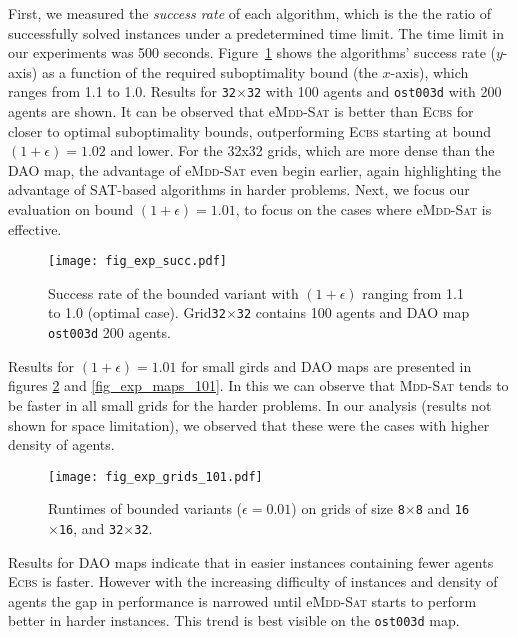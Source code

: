 \documentclass[letterpaper]{article}
\begin{document}
First, we measured the {\em success rate} of each algorithm, which is the the ratio of successfully solved instances under a predetermined time limit. The time limit in our experiments was 500 seconds. 
Figure~\ref{fig_exp_succ} shows the algorithms' success rate ($y$-axis) as a function of the required suboptimality bound (the $x$-axis), which ranges from 1.1 to 1.0. Results for \texttt{32$\times$32} with 100 agents and  \texttt{ost003d} with 200 agents are shown. It can be observed that  e\textsc{Mdd-Sat} is better than \textsc{Ecbs} for closer to optimal suboptimality bounds, 
outperforming  \textsc{Ecbs} starting at bound $(1+\epsilon)=1.02$ and lower. 
For the 32x32 grids, which are more dense than the DAO map, the advantage of e\textsc{Mdd-Sat}
even begin earlier, again highlighting the advantage of SAT-based algorithms in harder problems. 
Next, we focus our evaluation on bound $(1+\epsilon)=1.01$, to focus on the cases 
where e\textsc{Mdd-Sat} is effective. 

\begin{figure}[h]
\texttt{[image: fig\_exp\_succ.pdf]}
\caption{Success rate of the bounded variant with $(1+\epsilon)$ ranging from 1.1 to 1.0 (optimal case). Grid\texttt{32$\times$32} contains 100 agents and DAO map \texttt{ost003d} 200 agents.}
\label{fig_exp_succ}
\end{figure}

Results for $(1+\epsilon)=1.01$  for small girds and DAO maps are presented in figures \ref{fig_exp_grids_101} and \ref{fig_exp_maps_101}. In this we can observe that \textsc{Mdd-Sat} tends to be faster in all small grids for the harder problems. In our analysis (results not shown for space limitation), we observed that these were the cases with higher density of agents. 

\begin{figure}[h]
\texttt{[image: fig\_exp\_grids\_101.pdf]}
\caption{Runtimes of bounded variants ($\epsilon=0.01$) on grids of size \texttt{8$\times$8} and \texttt{16$\times$16}, and \texttt{32$\times$32}.}
\label{fig_exp_grids_101}
\end{figure}

Results for DAO maps indicate that in easier instances containing fewer agents \textsc{Ecbs} is faster. However with the increasing difficulty of instances and density of agents the gap in performance is narrowed until e\textsc{Mdd-Sat} starts to perform better in harder instances. This trend is best visible on the \texttt{ost003d} map.
\end{document}
